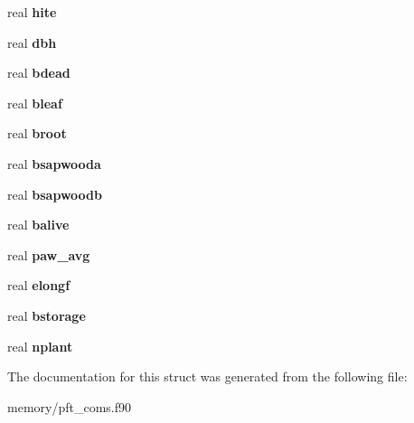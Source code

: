 \begin{DoxyCompactItemize}
\item 
\hypertarget{structpft__coms_1_1recruittype_ada76357440c3a76d0f6c490c8ed793f1}{
real {\bfseries hite}}
\label{structpft__coms_1_1recruittype_ada76357440c3a76d0f6c490c8ed793f1}

\item 
\hypertarget{structpft__coms_1_1recruittype_a7bb2f4d616311b96774ba965e579a625}{
real {\bfseries dbh}}
\label{structpft__coms_1_1recruittype_a7bb2f4d616311b96774ba965e579a625}

\item 
\hypertarget{structpft__coms_1_1recruittype_adbd20b6840a8ccdd160cd2ccea8dcca1}{
real {\bfseries bdead}}
\label{structpft__coms_1_1recruittype_adbd20b6840a8ccdd160cd2ccea8dcca1}

\item 
\hypertarget{structpft__coms_1_1recruittype_a9ad80c7a2b183b1bd3c799425f5641d0}{
real {\bfseries bleaf}}
\label{structpft__coms_1_1recruittype_a9ad80c7a2b183b1bd3c799425f5641d0}

\item 
\hypertarget{structpft__coms_1_1recruittype_a47ef4fb7a134ea59298a87b80da1b29f}{
real {\bfseries broot}}
\label{structpft__coms_1_1recruittype_a47ef4fb7a134ea59298a87b80da1b29f}

\item 
\hypertarget{structpft__coms_1_1recruittype_aa3e1c4c46afc1396b1f9231311c11503}{
real {\bfseries bsapwooda}}
\label{structpft__coms_1_1recruittype_aa3e1c4c46afc1396b1f9231311c11503}

\item 
\hypertarget{structpft__coms_1_1recruittype_aa212a897e4e1741b1f0bbcc35a34a1bd}{
real {\bfseries bsapwoodb}}
\label{structpft__coms_1_1recruittype_aa212a897e4e1741b1f0bbcc35a34a1bd}

\item 
\hypertarget{structpft__coms_1_1recruittype_ad4aba73ec3b526ea8c0e2ee5641cb988}{
real {\bfseries balive}}
\label{structpft__coms_1_1recruittype_ad4aba73ec3b526ea8c0e2ee5641cb988}

\item 
\hypertarget{structpft__coms_1_1recruittype_a8c5c9e4dd1c79535ab5b03e8b5a5a981}{
real {\bfseries paw\_\-avg}}
\label{structpft__coms_1_1recruittype_a8c5c9e4dd1c79535ab5b03e8b5a5a981}

\item 
\hypertarget{structpft__coms_1_1recruittype_ac83204f451c9483aa4a078453970602e}{
real {\bfseries elongf}}
\label{structpft__coms_1_1recruittype_ac83204f451c9483aa4a078453970602e}

\item 
\hypertarget{structpft__coms_1_1recruittype_af49417a4c10681ac32f8e4f0ee7a52b5}{
real {\bfseries bstorage}}
\label{structpft__coms_1_1recruittype_af49417a4c10681ac32f8e4f0ee7a52b5}

\item 
\hypertarget{structpft__coms_1_1recruittype_af6c130e8404bba50cc5d84f9d0619665}{
real {\bfseries nplant}}
\label{structpft__coms_1_1recruittype_af6c130e8404bba50cc5d84f9d0619665}

\end{DoxyCompactItemize}


The documentation for this struct was generated from the following file:\begin{DoxyCompactItemize}
\item 
memory/pft\_\-coms.f90\end{DoxyCompactItemize}
